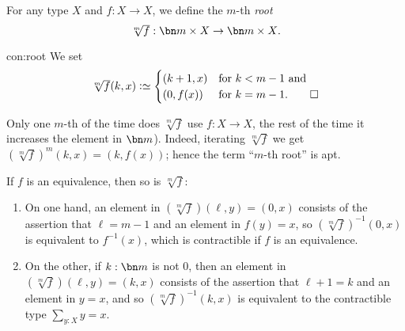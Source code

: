 \begin{example}
\begin{construction}\label{con:root}
  For any type $X$ and $f:X\to X$, we define the $m$-th \emph{root}
  \[
    {\textstyle\sqrt[m]f} : {\bn m\times X} \to {\bn m\times X}.
  \]
\end{construction}
\begin{implementation}{con:root}
  We set
  \[
    {\textstyle\sqrt[m]f}(k,x)\defeq
    \begin{cases}
      (k+1,x)& \text{for $k<m-1$ and}\\
      (0,f(x))& \text{for $k=m-1$}.\qedhere
    \end{cases}
  \]
\end{implementation}
Only one $m$-th of the time does $\sqrt[m]f$ use $f:X\to X$,
the rest of the time it increases the element in $\bn m$).
Indeed, iterating $\sqrt[m]f$ we get $(\sqrt[m]f)^m(k,x)=(k,f(x))$;
hence the term ``$m$-th root'' is apt.

If $f$ is an equivalence, then so is $\sqrt[m]f$:
\begin{enumerate}
\item On one hand, an element in  $(\sqrt[m]f)(\ell,y) = (0,x)$ consists
of the assertion that  $\ell=m-1$ and an element in $f(y)=x$,
so  $(\sqrt[m]f)^{-1}(0,x)$ is equivalent
to $f^{-1}(x)$, which is contractible if $f$ is an equivalence.
\item On the other, if $k:\bn m$ is not $0$, then
 an element in $(\sqrt[m]f)(\ell,y)=(k,x)$
 consists of the assertion that $\ell+1=k$ and an element in $y=x$, and so
$(\sqrt[m]f)^{-1}(k,x)$ is equivalent to the contractible type $\sum_{y:X}y=x$.
\end{enumerate}


\end{example}
